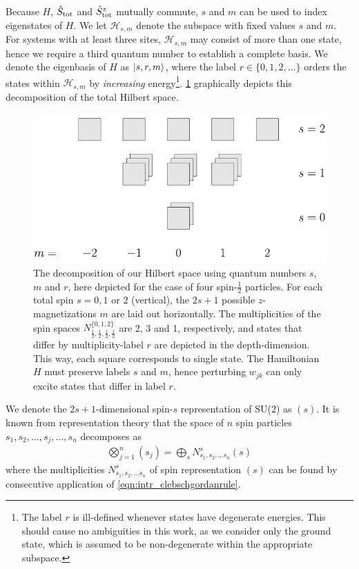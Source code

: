 Because $H$, ${\hat{S}_\text{tot}}$ and ${\hat{S}^z_\text{tot}}$ mutually commute, $s$ and $m$ can be used to index eigenstates of $H$. We let $\mathcal{H}_{s,m}$ denote the subspace with fixed values $s$ and $m$. For systems with at least three sites, $\mathcal{H}_{s,m}$ may consist of more than one state, hence we require a third quantum number to establish a complete basis. We denote the eigenbasis of $H$ as $\lvert s,r,m\rangle$, where the label $r \in \{0, 1, 2, \ldots \}$ orders the states within $\mathcal{H}_{s,m}$ by \emph{increasing} energy\footnote{The label $r$ is ill-defined whenever states have degenerate energies. This should cause no ambiguities in this work, as we consider only the ground state, which is assumed to be non-degenerate within the appropriate subspace.}. \cref{fig:HeisenbergSubspaces} graphically depicts this decomposition of the total Hilbert space.

\begin{figure}
\centering
\includegraphics[width=.6\textwidth]{img_manuscript/HeisenbergSubspaces_flat.pdf} 
\caption{The decomposition of our Hilbert space using quantum numbers $s$, $m$ and $r$, here depicted for the case of four spin-$\frac{1}{2}$ particles. For each total spin $s =0, 1$ or $2$ (vertical), the $2s+1$ possible $z$-magnetizations $m$ are laid out horizontally. The multiplicities of the spin spaces $N_{\frac{1}{2},\frac{1}{2},\frac{1}{2},\frac{1}{2}}^{\{0,1,2\}}$ are 2, 3 and 1, respectively, and states that differ by multiplicity-label $r$ are depicted in the depth-dimension. This way, each square corresponds to single state. The Hamiltonian $H$ must preserve labels $s$ and $m$, hence perturbing $w_{jk}$ can only excite states that differ in label $r$. }
\label{fig:HeisenbergSubspaces}
\end{figure}

We denote the $2s+1$-dimensional spin-$s$ representation of SU($2$) as $(s)$. It is known from representation theory that the space of $n$ spin particles $s_1, s_2, \ldots, s_j, \ldots, s_n$ decomposes as 
\begin{align}
\bigotimes_{j=1}^n (s_j) = \bigoplus_{s} N_{s_1, s_2, \ldots s_n}^{s} (s) 
\label{eqn:clebschgordan}
\end{align}
where the multiplicities $N^s_{s_1, s_2, \ldots s_n}$ of spin representation $(s)$ can be found by consecutive application of \cref{eqn:intr_clebschgordanrule}. 

